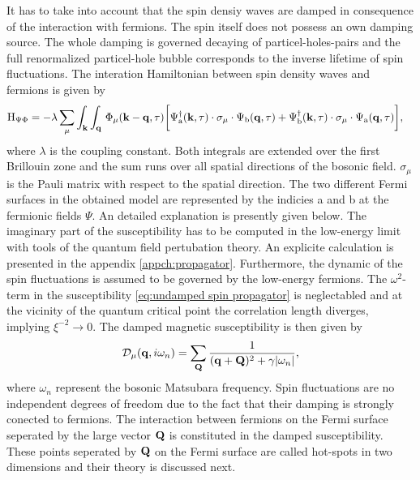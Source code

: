 It has to take into account that the spin densiy waves are damped in consequence of the interaction with fermions.
The spin itself does not possess an own damping source.
The whole damping is governed decaying of particel-holes-pairs and the full renormalized particel-hole bubble corresponds to the inverse lifetime of spin fluctuations.
The interation Hamiltonian between spin density waves and fermions is given by
%
\begin{align}
	\mathrm{H}_{\Psi\Phi} &= 
		-\lambda \sum\limits_{\mu} \int_{\vb{k}} \int_{\vb{q}}\,
		\Phi_{\mu}(\vb{k}-\vb{q}, \tau)
		\bigg[
			\Psi_{\mathrm{a}}^{\dag}(\vb{k},\tau) \cdot \sigma_{\mu} \cdot \Psi_{\mathrm{b}}(\vb{q},\tau)
			+
			\Psi_{\mathrm{b}}^{\dag}(\vb{k},\tau) \cdot \sigma_{\mu} \cdot \Psi_{\mathrm{a}}(\vb{q},\tau)
		\bigg],
	\label{eq:Hamiltonian interaction}
\end{align}
%
where $\lambda$ is the coupling constant. 
Both integrals are extended over the first Brillouin zone and the sum runs over all spatial directions of the bosonic field.
$\sigma_{\mu}$ is the Pauli matrix with respect to the spatial direction.
The two different Fermi surfaces in the obtained model are represented by the indicies a and b at the fermionic fields $\Psi$.
An detailed explanation is presently given below.
The imaginary part of the susceptibility has to be computed in the low-energy limit with tools of the quantum field pertubation theory.
An explicite calculation is presented in the appendix \ref{appch:propagator}.
Furthermore, the dynamic of the spin fluctuations is assumed to be governed by the low-energy fermions.
The $\omega^{2}$-term in the susceptibility \eqref{eq:undamped spin propagator} is neglectabled \cite{Abanov&Chubukov&Schmalian} and at the vicinity of the quantum critical point the correlation length diverges, implying $\xi^{-2} \to 0$.
The damped magnetic susceptibility is then given by
%
\begin{align}
	\mathcal{D}_{\mu}(\vb{q}, i\omega_{n}) = \sum\limits_{\vb{Q}} \frac{1}{(\vb{q}+\vb{Q})^{2} + \gamma|\omega_{n}|},
	\label{eq:damped spin propagator}
\end{align}
%
where $\omega_{n}$ represent the bosonic Matsubara frequency.
Spin fluctuations are no independent degrees of freedom due to the fact that their damping is strongly conected to fermions.
The interaction between fermions on the Fermi surface seperated by the large vector $\vb{Q}$ is constituted in the damped susceptibility.
These points seperated by $\vb{Q}$ on the Fermi surface are called hot-spots in two dimensions and their theory is discussed next.
